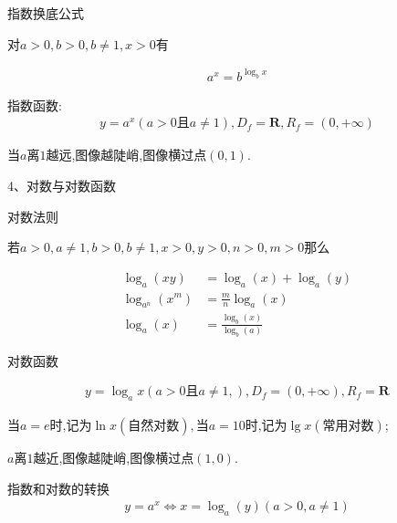 \documentclass[utf8]{ctexart}
\begin{document}
指数换底公式

对$a>0,b>0,b\neq 1,x>0$有

\begin{align}
    a^x=b^{\log_{b}x}
\end{align}

指数函数:
\begin{align}
    y=a^{x}(a>0\text{且}a\neq 1),D_{f}=\mathbf{R} ,R_{f}=(0,+\infty )
\end{align}
    
当$a$离$1$越远,图像越陡峭,图像横过点$(0,1)$.

\newpage

4、对数与对数函数

对数法则

若$a>0,a\neq 1,b>0,b\neq 1,x>0,y>0,n>0,m>0$那么

\begin{align}
    \log _{a}(xy)&=\log _{a}(x)+\log _{a}(y)\\
    \log _{a^n}(x^m)&=\frac{m}{n}\log _{a}(x)\\
    \log _{a}(x)&=\frac{\log _{b}(x)}{\log _{b}(a)}
\end{align}


对数函数

\begin{align}
    y=\log _{a}x(a>0\text{且}a\neq 1,),D_{f}=(0,+\infty ) ,R_{f}=\mathbf{R} 
\end{align}

$\text{当}a=e\text{时,记为}\ln x(\text{自然对数}),\text{当}a=10\text{时,记为}\lg x(\text{常用对数})$;

$a$离$1$越近,图像越陡峭,图像横过点$(1,0)$.

指数和对数的转换
\begin{align}
    y=a^{x}\Leftrightarrow x=\log _{a}(y)(a>0,a\neq 1)
\end{align}
\end{document}
